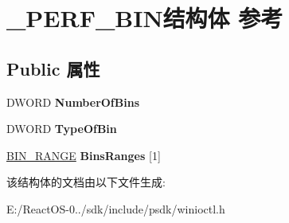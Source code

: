 \hypertarget{struct___p_e_r_f___b_i_n}{}\section{\+\_\+\+P\+E\+R\+F\+\_\+\+B\+I\+N结构体 参考}
\label{struct___p_e_r_f___b_i_n}
\subsection*{Public 属性}
\begin{DoxyCompactItemize}
\item 
\mbox{\label{struct___p_e_r_f___b_i_n_a4bb2cd0b4c9e8db8ee7bc71341ca1753}} 
D\+W\+O\+RD {\bfseries Number\+Of\+Bins}
\item 
\mbox{\label{struct___p_e_r_f___b_i_n_aebb4c049633d63f67b4b15f6f9ea1455}} 
D\+W\+O\+RD {\bfseries Type\+Of\+Bin}
\item 
\mbox{\label{struct___p_e_r_f___b_i_n_a89006e0065df719f5ddae29dda94ab7d}} 
\hyperlink{struct___b_i_n___r_a_n_g_e}{B\+I\+N\+\_\+\+R\+A\+N\+GE} {\bfseries Bins\+Ranges} \mbox{[}1\mbox{]}
\end{DoxyCompactItemize}


该结构体的文档由以下文件生成\+:\begin{DoxyCompactItemize}
\item 
E\+:/\+React\+O\+S-\/0../sdk/include/psdk/winioctl.\+h\end{DoxyCompactItemize}
